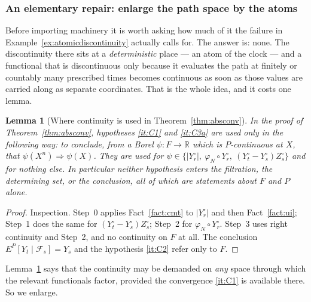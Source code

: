 \documentclass[11pt,a4paper]{article}
\theoremstyle{plain}
\newtheorem{lemma}[theorem]{Lemma}
\theoremstyle{definition}
\theoremstyle{remark}
\newcommand{\R}{\mathbb{R}}
\newcommand{\Filt}{\mathcal{F}}
\DeclareMathOperator*{\wto}{\Rightarrow}
\begin{document}
\subsubsection*{An elementary repair: enlarge the path space by the atoms}

Before importing machinery it is worth asking how much of it the failure in
Example~\ref{ex:atomicdiscontinuity} actually calls for.  The answer is: none.
The discontinuity there sits at a \emph{deterministic} place --- an atom of the
clock --- and a functional that is discontinuous only because it evaluates the
path at finitely or countably many prescribed times becomes continuous as soon as
those values are carried along as separate coordinates.  That is the whole idea,
and it costs one lemma.

\begin{lemma}[Where continuity is used in Theorem~\ref{thm:absconv}]
  \label{lem:contuse}
  In the proof of Theorem~\ref{thm:absconv}, hypotheses \ref{it:C1} and
  \ref{it:C3a} are used only in the following way: to conclude, from a Borel
  $\psi : F \to \R$ which is $P$-continuous at $X$, that
  $\psi(X^n) \wto \psi(X)$.  They are used for
  $\psi \in \{ |Y^\circ_r| ,\ \varphi_N \circ Y^\circ_r ,\
  (Y^\circ_t - Y^\circ_s)Z^\circ_s \}$ and for nothing else.  In particular
  neither hypothesis enters the filtration, the determining set, or the
  conclusion, all of which are statements about $F$ and $P$ alone.
\end{lemma}

\begin{proof}
  Inspection.  Step~0 applies Fact~\ref{fact:cmt} to $|Y^\circ_r|$ and then
  Fact~\ref{fact:ui}; Step~1 does the same for
  $(Y^\circ_t-Y^\circ_s)Z^\circ_s$; Step~2 for $\varphi_N \circ Y^\circ_r$.
  Step~3 uses right continuity and Step~2, and no continuity on $F$ at all.  The
  conclusion $E^P[Y_t \mid \Filt_s] = Y_s$ and the hypothesis \ref{it:C2} refer
  only to $F$.
\end{proof}

Lemma~\ref{lem:contuse} says that the continuity may be demanded on \emph{any}
space through which the relevant functionals factor, provided the convergence
\ref{it:C1} is available there.  So we enlarge.
\end{document}
